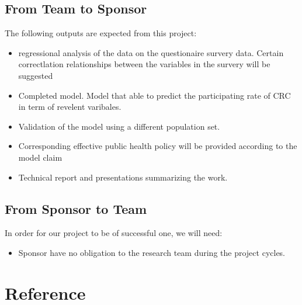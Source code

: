 \documentclass[12pt,letterpaper]{article}
\theoremstyle{definition}
\begin{document}
\subsection{From Team to Sponsor} %
The following outputs are expected from this project:
\begin{itemize}
    \item regressional analysis of the data on the questionaire survery data. 
        Certain correctlation relationships between the variables in the survery will be suggested 
    \item Completed model. Model that able to predict the participating rate of CRC in term of revelent varibales.
    \item Validation of the model using a different population set. 
    \item Corresponding effective public health policy will be provided according to the model claim
    \item Technical report and presentations summarizing the work. 
\end{itemize}

\subsection{From Sponsor to Team} %

In order for our project to be of successful one, we will need:
\begin{itemize}
    \item Sponsor have no obligation to the research team during the project cycles.
\end{itemize}

\section{Reference}

%
%
\end{document}
